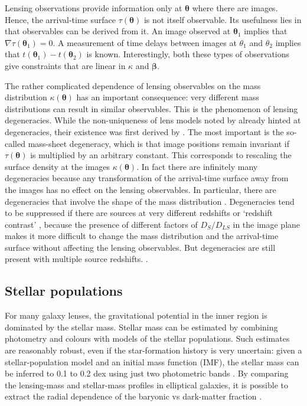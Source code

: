 \documentclass[galley,usenatbib]{mn2e}
\renewcommand{\vec}[1]{\ensuremath{\boldsymbol{#1}}}
\begin{document}
Lensing observations provide information only at $\vec\theta$ where there are
images.  Hence, the arrival-time surface $\tau(\vec\theta)$ is not itself
observable.  Its usefulness lies in that observables can be derived from it.
An image observed at $\vec\theta_1$ implies that $\nabla\tau(\vec\theta_1)=0$.
A measurement of time delays between images at $\theta_1$ and $\theta_2$
implies that $t(\vec\theta_1)-t(\vec\theta_2)$ is known.  Interestingly, both
these types of observations give constraints that are linear in $\kappa$ and
$\vec\beta$.

The rather complicated dependence of lensing observables on the mass
distribution $\kappa(\vec\theta)$ has an important consequence: very different
mass distributions can result in similar observables.  This is the phenomenon
of lensing degeneracies.  While the non-uniqueness of lens models noted by
\cite{1981ApJ...244..736Y} already hinted at degeneracies, their existence was
first derived by \cite{1985ApJ...289L...1F}.  The most important is the
so-called mass-sheet degeneracy, which is that image positions remain invariant
if $\tau(\vec\theta)$ is multiplied by an arbitrary constant.  This corresponds
to rescaling the surface density at the images $\kappa(\vec\theta)$. In fact
there are infinitely many degeneracies \citep{2000AJ....120.1654S} because any
transformation of the arrival-time surface away from the images has no effect
on the lensing observables.  In particular, there are degeneracies that involve
the shape of the mass distribution
\citep{2006ApJ...653..936S,2013arXiv1306.4675S}.  Degeneracies tend to be
suppressed if there are sources at very different redshifts or `redshift
contrast' \citep{1998AJ....116.1541A,2009ApJ...690..154S}, because the presence
of different factors of $D_S/D_{LS}$ in the image plane makes it more difficult
to change the mass distribution and the arrival-time surface without affecting
the lensing observables.  But degeneracies are still present with multiple
source redshifts.  \citep{2008MNRAS.386..307L}.

\subsection{Stellar populations} 

For many galaxy lenses, the gravitational potential in the inner region is
dominated by the stellar mass.  Stellar mass can be estimated by combining
photometry and colours with models of the stellar populations.  Such estimates
are reasonably robust, even if the star-formation history is very uncertain:
given a stellar-population model \citep[such as][]{2003MNRAS.344.1000B} and an
initial mass function (IMF), the stellar mass can be inferred to 0.1 to 0.2 dex
using just two photometric bands \citep[see e.g., Figure~1 in][]{2008MNRAS.383..857F}.
By comparing the lensing-mass and stellar-mass profiles in elliptical galaxies,
it is possible to extract the radial dependence of the baryonic vs dark-matter
fraction \citep{2005ApJ...623L...5F,2008MNRAS.383..857F,2011ApJ...740...97L}.
\end{document}
